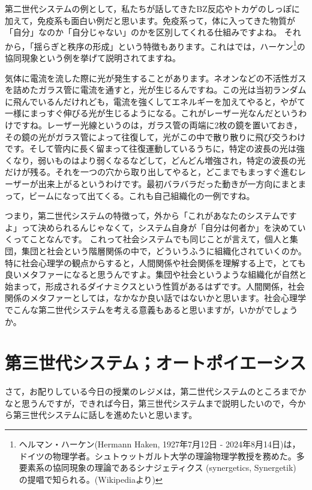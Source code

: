\documentclass{ltjsbook}
\begin{document}
第二世代システムの例として，私たちが話してきたBZ反応やトカゲのしっぽに加えて，免疫系も面白い例だと思います。免疫系って，体に入ってきた物質が「自分」なのか「自分じゃない」のかを区別してくれる仕組みですよね。
それから，「揺らぎと秩序の形成」という特徴もあります。これは\textcite{KawamotoHideo}では，ハーケン\footnote{ヘルマン・ハーケン(Hermann Haken, 1927年7月12日 - 2024年8月14日)は，ドイツの物理学者。シュトゥットガルト大学の理論物理学教授を務めた。多要素系の協同現象の理論であるシナジェティクス (synergetics, Synergetik) の提唱で知られる。(Wikipediaより)}の協同現象という例を挙げて説明されてますね。

気体に電流を流した際に光が発生することがあります。ネオンなどの不活性ガスを詰めたガラス管に電流を通すと，光が生じるんですね。この光は当初ランダムに飛んでいるんだけれども，電流を強くしてエネルギーを加えてやると，やがて一様にまっすぐ伸びる光が生じるようになる。これがレーザー光なんだというわけですね。レーザー光線というのは，ガラス管の両端に2枚の鏡を置いておき，その鏡の光がガラス管によって往復して，光がこの中で散り散りに飛び交うわけです。そして管内に長く留まって往復運動しているうちに，特定の波長の光は強くなり，弱いものはより弱くなるなどして，どんどん増強され，特定の波長の光だけが残る。それを一つの穴から取り出してやると，どこまでもまっすぐ進むレーザーが出来上がるというわけです。最初バラバラだった動きが一方向にまとまって，ビームになって出てくる。これも自己組織化の一例ですね。

つまり，第二世代システムの特徴って，外から「これがあなたのシステムですよ」って決められるんじゃなくて，システム自身が「自分は何者か」を決めていくってことなんです。
これって社会システムでも同じことが言えて，個人と集団，集団と社会という階層関係の中で，どういうふうに組織化されていくのか。特に社会心理学の観点からすると，人間関係や社会関係を理解する上で，とても良いメタファーになると思うんですよ。集団や社会というような組織化が自然と始まって，形成されるダイナミクスという性質があるはずです。人間関係，社会関係のメタファーとしては，なかなか良い話ではないかと思います。社会心理学でこんな第二世代システムを考える意義もあると思いますが，いかがでしょうか。

\section{第三世代システム；オートポイエーシス}

さて，お配りしている今日の授業のレジメは，第二世代システムのところまでかなと思うんですが，できれば今日，第三世代システムまで説明したいので，今から第三世代システムに話しを進めたいと思います。
\end{document}
